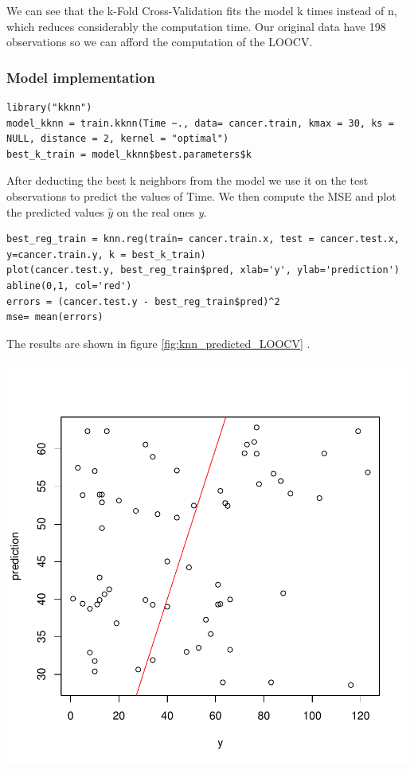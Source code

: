 \documentclass[]{report}
\begin{document}
We can see that the k-Fold Cross-Validation fits the model k times instead of n, which reduces considerably the computation time. Our original data have 198 observations so we can afford the computation of the LOOCV. \\

\subsubsection{Model implementation}

\begin{lstlisting}
library("kknn")
model_kknn = train.kknn(Time ~., data= cancer.train, kmax = 30, ks = NULL, distance = 2, kernel = "optimal")
best_k_train = model_kknn$best.parameters$k
\end{lstlisting}

After deducting the best k neighbors from the model we use it on the test observations to predict the values of Time. 
We then compute the MSE and plot the predicted values $\hat{y}$ on the real ones \textit{y}.

\begin{lstlisting}
best_reg_train = knn.reg(train= cancer.train.x, test = cancer.test.x, y=cancer.train.y, k = best_k_train)
plot(cancer.test.y, best_reg_train$pred, xlab='y', ylab='prediction')
abline(0,1, col='red')
errors = (cancer.test.y - best_reg_train$pred)^2
mse= mean(errors)
\end{lstlisting}

The results are shown in figure \ref{fig:knn_predicted_LOOCV}
.
\begin{center}
	\includegraphics[width=0.8\linewidth]{Figures/knn_predicted_LOOCV.pdf}
	\label{fig:knn_predicted_LOOCV}
\end{center}
\end{document}

